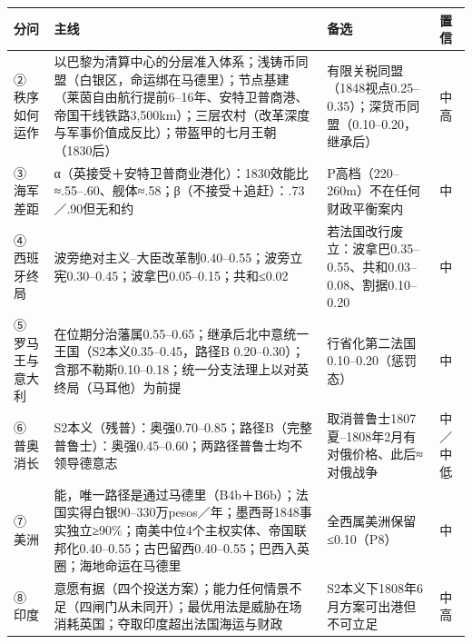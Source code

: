\documentclass[
  10pt,
  a4paper,
]{article}
\newcounter{none} %
\newcommand{\literalquote}{{\addfontfeatures{Mapping=}\char34}}
\begin{document}
{\def\LTcaptype{none} %
\begin{longtable}[]{@{}
  >{\raggedright\arraybackslash}p{}
  >{\raggedright\arraybackslash}p{}
  >{\raggedright\arraybackslash}p{}
  >{\raggedright\arraybackslash}p{}@{}}
\toprule\noalign{}
\begin{minipage}[b]{\linewidth}\raggedright
分问
\end{minipage} & \begin{minipage}[b]{\linewidth}\raggedright
主线
\end{minipage} & \begin{minipage}[b]{\linewidth}\raggedright
备选
\end{minipage} & \begin{minipage}[b]{\linewidth}\raggedright
置信
\end{minipage} \\
\midrule\noalign{}
\endhead
\bottomrule\noalign{}
\endlastfoot
② 秩序如何运作 &
以巴黎为清算中心的分层准入体系；浅铸币同盟（白银区，命运绑在马德里）；节点基建（莱茵自由航行提前6--16年、安特卫普商港、帝国干线铁路3,500km）；三层农村（改革深度与军事价值成反比）；\literalquote{}带盔甲的七月王朝\literalquote{}（1830后）
& 有限关税同盟（1848视点0.25--0.35）；深货币同盟（0.10--0.20，继承后） &
中高 \\
③ 海军差距 &
α（英接受＋安特卫普商业港化）：1830效能比≈.55--.60、舰体≈.58；β（不接受＋追赶）：.73／.90但无和约
& P高档（220--260m）不在任何财政平衡案内 & 中 \\
④ 西班牙终局 &
波旁绝对主义--大臣改革制0.40--0.55；波旁立宪0.30--0.45；波拿巴0.05--0.15；共和≤0.02
& 若法国改行废立：波拿巴0.35--0.55、共和0.03--0.08、割据0.10--0.20 &
中 \\
⑤ 罗马王与意大利 &
在位期分治藩属0.55--0.65；继承后北中意统一王国（S2本义0.35--0.45，路径B
0.20--0.30）；含那不勒斯0.10--0.18；统一分支法理上以对英终局（马耳他）为前提
& 行省化\literalquote{}第二法国\literalquote{}0.10--0.20（惩罚态） & 中 \\
⑥ 普奥消长 &
S2本义（残普）：奥强0.70--0.85；路径B（完整普鲁士）：奥强0.45--0.60；两路径普鲁士均不领导德意志
& 取消普鲁士1807夏--1808年2月有对俄价格、此后≈对俄战争 & 中／中低 \\
⑦ 美洲 &
能，唯一路径是通过马德里（B4b＋B6b）；法国实得白银90--330万pesos／年；墨西哥1848事实独立≥90\%；南美中位4个主权实体、帝国联邦化0.40--0.55；古巴留西0.40--0.55；巴西入英圈；海地命运在马德里
& 全西属美洲保留≤0.10（P8） & 中 \\
⑧ 印度 &
意愿有据（四个投送方案）；能力任何情景不足（四闸门从未同开）；最优用法是威胁在场消耗英国；夺取印度超出法国海运与财政
& S2本义下1808年6月方案可出港但不可立足 & 中高 \\
\end{longtable}
}
\end{document}
